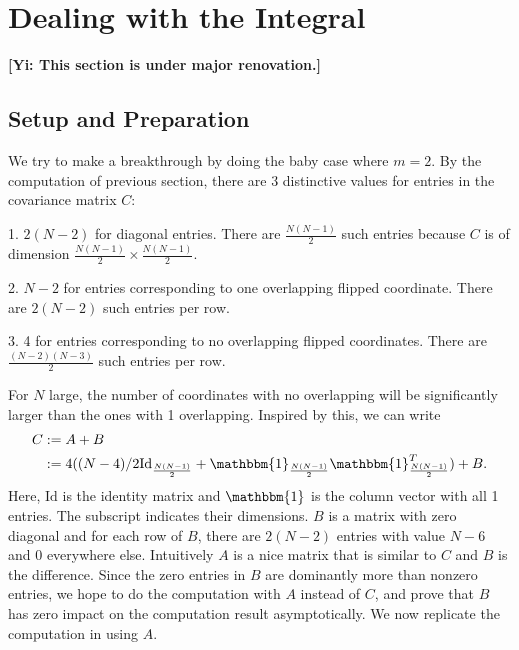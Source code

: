 \documentclass[10pt]{article}
\newcommand{\gy}[1]{\textbf{\color{red}[Yi: #1]}}
\newenvironment{Proof of lemma}{\noindent{\bf Proof of Lemma}}{\hfill$\Box$\newline}
\newenvironment{Proof of claim}{\noindent{\bf Proof of claim}}{\hfill$\Box$\newline}
\newenvironment{Proof of theorem}{\noindent{\bf Proof of Theorem}}{\hfill\scriptsize{$\Box$}\newline}
\newenvironment{Proof of theorems}{\noindent{\bf Proof of Theorems}}{\hfill$\Box$\newline}
\newenvironment{Proof of proposition}{\noindent{\bf Proof of Proposition}}{\hfill$\Box$\newline}
\newenvironment{Proof of propositions}{\noindent{\bf Proof of Propositions}}{\hfill$\Box$\newline}
\newenvironment{Proof of exercise}{\noindent{\it Proof of Exercise:}}{\hfill$\Box$}
\numberwithin{equation}{section}
\begin{document}

\section{Dealing with the Integral}
\gy{This section is under major renovation.}
\subsection{Setup and Preparation}
We try to make a breakthrough by doing the baby case where $m=2$. By the computation of previous section, there are 3 distinctive values for entries in the covariance matrix $C$:

1. $2(N-2)$ for diagonal entries. There are $\frac{N(N-1)}{2}$ such entries because $C$ is of dimension $\frac{N(N-1)}{2} \times \frac{N(N-1)}{2}$.

2. $N-2$ for entries corresponding to one overlapping flipped coordinate. There are $2(N-2)$ such entries per row.

3. 4 for entries corresponding to no overlapping flipped coordinates. There are $\frac{(N-2)(N-3)}{2}$ such entries per row.

For $N$ large, the number of coordinates with no overlapping will be significantly larger than the ones with 1 overlapping. Inspired by this, we can write
\begin{align} \label{approx_mat_def}
    C &:= A + B \nonumber \\
      &:= 4((N-4)/2\text{Id}_{\frac{N(N-1)}{2}} + \mathbbm{1}_{\frac{N(N-1)}{2}}\mathbbm{1}^T_{\frac{N(N-1)}{2}}) + B.
\end{align}
Here, $\text{Id}$ is the identity matrix and $\mathbbm{1}$ is the column vector with all 1 entries. The subscript indicates their dimensions. $B$ is a matrix with zero diagonal and for each row of $B$, there are $2(N-2)$ entries with value $N-6$ and 0 everywhere else. Intuitively $A$ is a nice matrix that is similar to $C$ and $B$ is the difference. Since the zero entries in $B$ are dominantly more than nonzero entries, we hope to do the computation with $A$ instead of $C$, and prove that $B$ has zero impact on the computation result asymptotically.
We now replicate the computation in \cite{SK_optimal} using $A$. 
\end{document}
